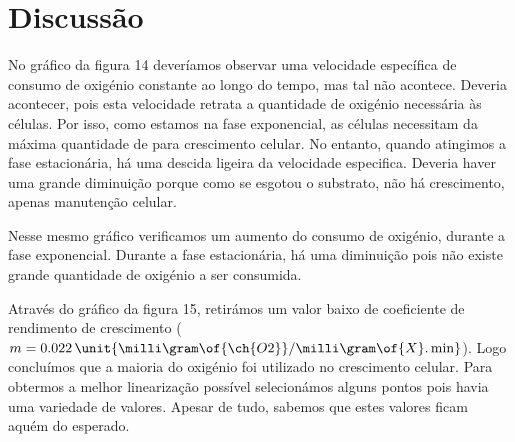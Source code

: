 \documentclass[\mainfilename]{subfiles}
\begin{document}
\begin{sectionBox}
\begin{center}
    \end{center}
    
    \section*{Discussão}
    No gráfico da figura 14 deveríamos observar uma velocidade específica de consumo de oxigénio constante ao longo do tempo, mas tal não acontece. Deveria acontecer, pois esta velocidade retrata a quantidade de oxigénio necessária às células. Por isso, como estamos na fase exponencial, as células necessitam da máxima quantidade de  para crescimento celular. No entanto, quando atingimos a fase estacionária, há uma descida ligeira da velocidade especifica. Deveria haver uma grande diminuição porque como se esgotou o substrato, não há crescimento, apenas manutenção celular.\par
    Nesse mesmo gráfico verificamos um aumento do consumo de oxigénio, durante a fase exponencial. Durante a fase estacionária, há uma diminuição pois não existe grande quantidade de oxigénio a ser consumida.\par
    Através do gráfico da figura 15, retirámos um valor baixo de coeficiente de rendimento de crescimento (\(m= 0.022\,\unit{\milli\gram\of{\ch{O2}}/\milli\gram\of{X}.\min}\)). Logo concluímos que a maioria do oxigénio foi utilizado no crescimento celular. Para obtermos a melhor linearização possível selecionámos alguns pontos pois havia uma variedade de valores. Apesar de tudo, sabemos que estes valores ficam aquém do esperado.

\end{sectionBox}
\end{document}
